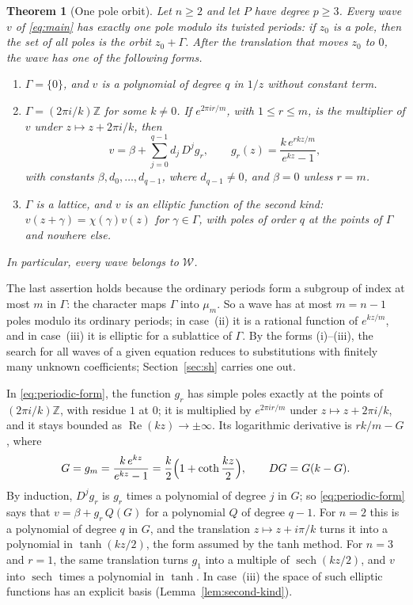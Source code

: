 \documentclass[11pt]{article}
\newtheorem{mainthm}{Theorem}
\theoremstyle{definition}
\theoremstyle{remark}
\numberwithin{equation}{section}
\newcommand{\ZZ}{\mathbb Z}
\newcommand{\Wclass}{\mathcal W}
\DeclareMathOperator{\sech}{sech}
\begin{document}
\begin{mainthm}[One pole orbit]\label{thm:A}
Let \(n\ge2\) and let \(P\) have degree \(p\ge3\). Every wave \(v\)
of \eqref{eq:main} has exactly one pole modulo its twisted periods: if
\(z_0\) is a pole, then the set of all poles is the orbit
\(z_0+\Gamma\). After the translation that moves \(z_0\) to \(0\), the
wave has one of the following forms.
\begin{enumerate}[label=\textup{(\roman*)},leftmargin=2.2em]
\item \(\Gamma=\{0\}\), and \(v\) is a polynomial of degree \(q\) in
\(1/z\) without constant term.
\item \(\Gamma=(2\pi i/k)\ZZ\) for some \(k\ne0\). If
\(e^{2\pi ir/m}\), with \(1\le r\le m\), is the multiplier of \(v\)
under \(z\mapsto z+2\pi i/k\), then
\begin{equation}\label{eq:periodic-form}
 v=\beta+\sum_{j=0}^{q-1}d_j\,D^jg_r,\qquad
 g_r(z)=\frac{k\,e^{rkz/m}}{e^{kz}-1},
\end{equation}
with constants \(\beta,d_0,\dots,d_{q-1}\), where \(d_{q-1}\ne0\), and
\(\beta=0\) unless \(r=m\).
\item \(\Gamma\) is a lattice, and \(v\) is an elliptic function of the
second kind: \(v(z+\gamma)=\chi(\gamma)v(z)\) for \(\gamma\in\Gamma\),
with poles of order \(q\) at the points of \(\Gamma\) and nowhere else.
\end{enumerate}
In particular, every wave belongs to \(\Wclass\).
\end{mainthm}

The last assertion holds because the ordinary periods form a subgroup
of index at most \(m\) in \(\Gamma\): the character maps \(\Gamma\)
into \(\mu_m\). So a wave has at most \(m=n-1\) poles modulo its
ordinary periods; in case~(ii) it is a rational function of
\(e^{kz/m}\), and in case~(iii) it is elliptic for a sublattice of
\(\Gamma\). By the forms (i)--(iii), the search for all waves of a
given equation reduces to substitutions with finitely many unknown
coefficients; Section~\ref{sec:sh} carries one out.

In \eqref{eq:periodic-form}, the function \(g_r\) has simple poles
exactly at the points of \((2\pi i/k)\ZZ\), with residue \(1\) at
\(0\); it is multiplied by \(e^{2\pi ir/m}\) under
\(z\mapsto z+2\pi i/k\), and it stays bounded as
\(\operatorname{Re}(kz)\to\pm\infty\). Its logarithmic derivative is
\(rk/m-G\), where
\[
 G=g_m=\frac{k\,e^{kz}}{e^{kz}-1}=\frac k2\Bigl(1+\coth\frac{kz}{2}\Bigr),
 \qquad DG=G(k-G).
\]
By induction, \(D^jg_r\) is \(g_r\) times a polynomial of degree \(j\)
in \(G\); so \eqref{eq:periodic-form} says that \(v=\beta+g_r\,Q(G)\)
for a polynomial \(Q\) of degree \(q-1\). For \(n=2\) this is a
polynomial of degree \(q\) in \(G\), and the translation
\(z\mapsto z+i\pi/k\) turns it into a polynomial in \(\tanh(kz/2)\),
the form assumed by the tanh method. For \(n=3\) and \(r=1\), the same
translation turns \(g_1\) into a multiple of \(\sech(kz/2)\), and \(v\)
into \(\sech\) times a polynomial in \(\tanh\). In case~(iii) the space
of such elliptic functions has an explicit basis
(Lemma~\ref{lem:second-kind}).
\end{document}
